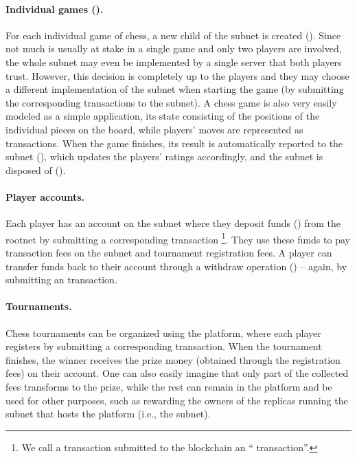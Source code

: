 \paragraph{Individual games ().}
For each individual game of chess, a new child of the  subnet is created ().
Since not much is usually at stake in a single game and only two players are involved,
the whole  subnet may even be implemented by a single server that both players trust.
However, this decision is completely up to the players and they may choose a different implementation of the  subnet
when starting the game (by submitting the corresponding transactions to the  subnet).
A chess game is also very easily modeled as a simple application, its state consisting of the positions of the individual pieces on the board,
while players' moves are represented as transactions.
When the game finishes, its result is automatically reported to the  subnet (), which updates the players' ratings accordingly,
and the  subnet is disposed of ().

\paragraph{Player accounts.}
Each player has an account on the  subnet where they deposit funds () from the rootnet by submitting a corresponding  transaction%
\footnote{We call a transaction submitted to the  blockchain an `` transaction''.}.
They use these funds to pay transaction fees on the  subnet and tournament registration fees.
A player can transfer funds back to their  account through a withdraw operation () -- again, by submitting an  transaction.

\paragraph{Tournaments.}
Chess tournaments can be organized using the platform, where each player registers by submitting a corresponding  transaction.
When the tournament finishes, the winner receives the prize money (obtained through the registration fees) on their  account.
One can also easily imagine that only part of the collected fees transforms to the prize, while the rest can remain in the platform
and be used for other purposes, such as rewarding the owners of the replicas running the subnet that hosts the platform (i.e., the  subnet).


